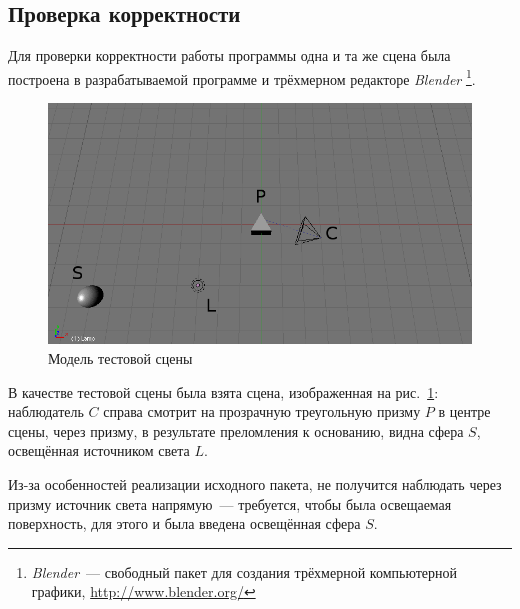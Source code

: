 \documentclass[a4paper,10pt]{article}
\begin{document}
\subsection{Проверка корректности}
Для проверки корректности работы программы одна и та же сцена была построена в разрабатываемой программе и
трёхмерном редакторе \textit{Blender}%
\footnote{\textit{Blender}~--- свободный пакет для создания трёхмерной компьютерной графики, \url{http://www.blender.org/}}.
\begin{figure}[h!]
  \centering
  \includegraphics[width=0.8\linewidth]{./screenshots/prism_test_model.png}
  \caption{Модель тестовой сцены}
  \label{fig:prism-test-model}
\end{figure}
В качестве тестовой сцены была взята сцена, изображенная на рис.~\ref{fig:prism-test-model}: 
наблюдатель $C$ справа смотрит на прозрачную треугольную призму $P$ в центре сцены,
через призму, в результате преломления к основанию, видна сфера $S$, освещённая источником света $L$.

Из-за особенностей реализации исходного пакета, не получится наблюдать через призму источник света напрямую~---
требуется, чтобы была освещаемая поверхность, для этого и была введена освещённая сфера $S$.
\end{document}
